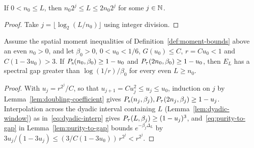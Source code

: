 \begin{lemma}
  \label{lem:dyadic-window}
  \leanok
  If \(0 < n_0 \le L\), then \(n_0 2^j \le L \le 2 n_0 2^j\) for some \(j \in \mathbb{N}\).
\end{lemma}
\begin{proof}
  \leanok
  Take \(j = \lfloor \log_2 (L / n_0) \rfloor\) using integer division.
\end{proof}

\begin{theorem}
  \label{thm:gap-of-coefficient}
  \leanok
  Assume the spatial moment inequalities of Definition~\ref{def:moment-bounds} above an even
  \(n_0 > 0\), and let \(\beta_0 > 0\), \(0 < u_0 < 1/6\), \(G(u_0) \le C\), \(r = Cu_0 < 1\) and
  \(C(1 - 3u_0) > 3\). If \(P_{\mathrm{s}}(n_0, \beta_0) \ge 1 - u_0\) and
  \(P_{\tau}(2n_0, \beta_0) \ge 1 - u_0\), then \(E_L\) has a spectral gap greater than
  \(\log(1/r)/\beta_0\) for every even \(L \ge n_0\).
\end{theorem}
\begin{proof}
  \leanok
  With \(u_j = r^{2^j}/C\), so that \(u_{j+1} = Cu_j^2 \le u_j \le u_0\), induction on \(j\) by
  Lemma~\ref{lem:doubling-coefficient} gives \(P_{\mathrm{s}}(n_j, \beta_j), P_{\tau}(2n_j, \beta_j) \ge 1 - u_j\).
  Interpolation across the dyadic interval containing \(L\) (Lemma~\ref{lem:dyadic-window}) as
  in~\eqref{eq:dyadic-interp} gives \(P_{\tau}(L, \beta_j) \ge (1-u_j)^3\), and~\eqref{eq:purity-to-gap}
  in Lemma~\ref{lem:purity-to-gap} bounds \(e^{-\beta_j \Delta_L}\) by
  \(3u_j / (1 - 3u_j) \le (3/C(1-3u_0))\, r^{2^j} < r^{2^j}\).
\end{proof}

